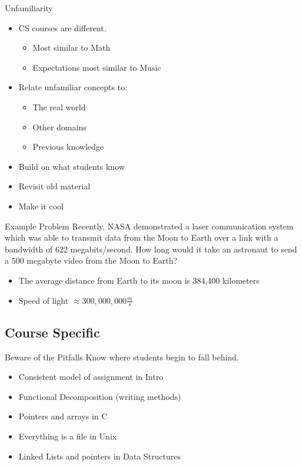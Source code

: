 \documentclass[11pt]{beamer}
\begin{document}
\begin{frame}{Unfamiliarity}
	\begin{itemize}
		\item CS courses are different.
		\begin{itemize}
			\item Most similar to Math
			\item Expectations most similar to Music
		\end{itemize}
		
		\item Relate unfamiliar concepts to:
		\begin{itemize}
			\item The real world
			\item Other domains
			\item Previous knowledge
		\end{itemize}
		\item Build on what students know
		\item Revisit old material
		\item Make it cool
		
	\end{itemize}
\end{frame}

\begin{frame}{Example Problem}
	Recently, NASA demonstrated a laser communication system which was able to transmit data from the Moon to Earth over a link with a bandwidth of 622 megabits/second.  How long would it take an astronaut to send a 500 megabyte video from the Moon to Earth?
	
	\begin{itemize}
		\item The average distance from Earth to its moon is 384,400 kilometers
		
		\item Speed of light  $\approx 300,000,000  \frac{m}{s} $
		
	\end{itemize}
\end{frame}

\subsection{Course Specific}


\begin{frame}{Beware of the Pitfalls}
	Know where students begin to fall behind.
	\begin{itemize}
		\item Consistent model of assignment in Intro
		\item Functional Decomposition (writing methods)
		\item Pointers and arrays in C
		\item Everything is a file in Unix
		\item Linked Lists and pointers in Data Structures
	\end{itemize}
\end{frame}
\end{document}
